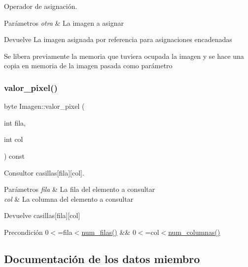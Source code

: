 Operador de asignación. 


\begin{DoxyParams}{Parámetros}
{\em otra} & La imagen a asignar \\
\hline
\end{DoxyParams}
\begin{DoxyReturn}{Devuelve}
La imagen asignada por referencia para asignaciones encadenadas
\end{DoxyReturn}
Se libera previamente la memoria que tuviera ocupada la imagen y se hace una copia en memoria de la imagen pasada como parámetro \mbox{\label{classImagen_a7d9378695a7fd2dce8092f180e716229}} 
\subsubsection{\texorpdfstring{valor\+\_\+pixel()}{valor\_pixel()}}
{\footnotesize\ttfamily byte Imagen\+::valor\+\_\+pixel (\begin{DoxyParamCaption}\item[{int}]{fila,  }\item[{int}]{col }\end{DoxyParamCaption}) const\hspace{0.3cm}{\ttfamily [inline]}}



Consultor casillas\mbox{[}fila\mbox{]}\mbox{[}col\mbox{]}. 


\begin{DoxyParams}{Parámetros}
{\em fila} & La fila del elemento a consultar \\
\hline
{\em col} & La columna del elemento a consultar \\
\hline
\end{DoxyParams}
\begin{DoxyReturn}{Devuelve}
casillas\mbox{[}fila\mbox{]}\mbox{[}col\mbox{]} 
\end{DoxyReturn}
\begin{DoxyPrecond}{Precondición}
0$<$=fila$<$\hyperlink{classImagen_a4cb4faa04f5e2913965e43a6a65acfd1}{num\+\_\+filas()} \&\& 0$<$=col$<$\hyperlink{classImagen_ac28d55c18064aea2a65e6fcf51d86191}{num\+\_\+columnas()} 
\end{DoxyPrecond}


\subsection{Documentación de los datos miembro}
\mbox{\label{classImagen_a151b692f46d9acc42be59fc0fdc50529}} 
